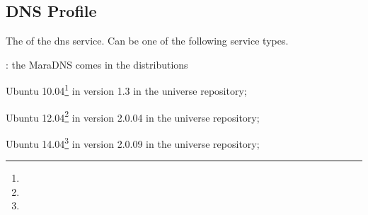 \label{sec:dns_profile}
\subsection{DNS Profile}


The  of the dns service. Can be one of the following 
service types.
\begin{asparaitem}
%
\item[\qcode{maradns}:] 
the MaraDNS comes in the distributions 
\begin{compactitem}
\item[\TheDistribution{ubuntu}] Ubuntu 10.04\footnote{\TheUbuntuMaverickLTSDate} in version 1.3 in the universe repository;
\item[\TheDistribution{ubuntu}] Ubuntu 12.04\footnote{\TheUbuntuPreciseLTSDate} in version 2.0.04 in the universe repository;
\item[\TheDistribution{ubuntu}] Ubuntu 14.04\footnote{\TheUbuntuTrustyLTSDate} in version 2.0.09 in the universe repository;
\end{compactitem}
%
\end{asparaitem}

